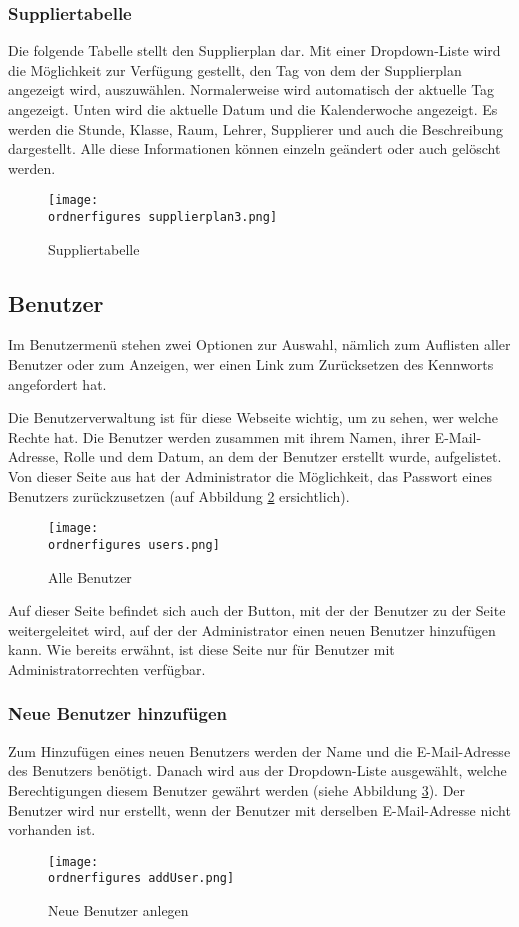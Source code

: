 \subsubsection{Suppliertabelle}
Die folgende Tabelle stellt den Supplierplan dar. Mit einer Dropdown-Liste wird die Möglichkeit zur Verfügung gestellt, den Tag von dem der Supplierplan angezeigt wird, auszuwählen. Normalerweise wird automatisch der aktuelle Tag angezeigt. Unten wird die aktuelle Datum und die Kalenderwoche angezeigt. Es werden die Stunde, Klasse, Raum, Lehrer, Supplierer und auch die Beschreibung dargestellt. Alle diese Informationen können einzeln geändert oder auch gelöscht werden.

\begin{figure}[H]
	\centering
	\texttt{[image: \\ordnerfigures supplierplan3.png]}
	\caption{Suppliertabelle}
	\label{fi:Suppliertabelle}
\end{figure} 
\subsection{Benutzer}
Im Benutzermenü stehen zwei Optionen zur Auswahl, nämlich zum Auflisten aller Benutzer oder zum Anzeigen, wer einen Link zum Zurücksetzen des Kennworts angefordert hat. 

Die Benutzerverwaltung ist für diese Webseite wichtig, um zu sehen, wer welche Rechte hat. Die Benutzer werden zusammen mit ihrem Namen, ihrer E-Mail-Adresse, Rolle und dem Datum, an dem der Benutzer erstellt wurde, aufgelistet. Von dieser Seite aus hat der Administrator die Möglichkeit, das Passwort eines Benutzers zurückzusetzen (auf Abbildung \ref*{fi:users} ersichtlich).

\begin{figure}[H]
	\centering
	\texttt{[image: \\ordnerfigures users.png]}
	\caption{Alle Benutzer}
	\label{fi:users}
\end{figure}

Auf dieser Seite befindet sich auch der Button, mit der der Benutzer zu der Seite weitergeleitet wird, auf der der Administrator einen neuen Benutzer hinzufügen kann. Wie bereits erwähnt, ist diese Seite nur für Benutzer mit Administratorrechten verfügbar.



\subsubsection{Neue Benutzer hinzufügen}
Zum Hinzufügen eines neuen Benutzers werden der Name und die E-Mail-Adresse des Benutzers benötigt. Danach wird aus der Dropdown-Liste ausgewählt, welche Berechtigungen diesem Benutzer gewährt werden (siehe Abbildung \ref{fi:addUser}). Der Benutzer wird nur erstellt, wenn der Benutzer mit derselben E-Mail-Adresse nicht vorhanden ist. 
\begin{figure}[h]
	\centering
	\texttt{[image: \\ordnerfigures addUser.png]}
	\caption{Neue Benutzer anlegen}
	\label{fi:addUser}
\end{figure}


